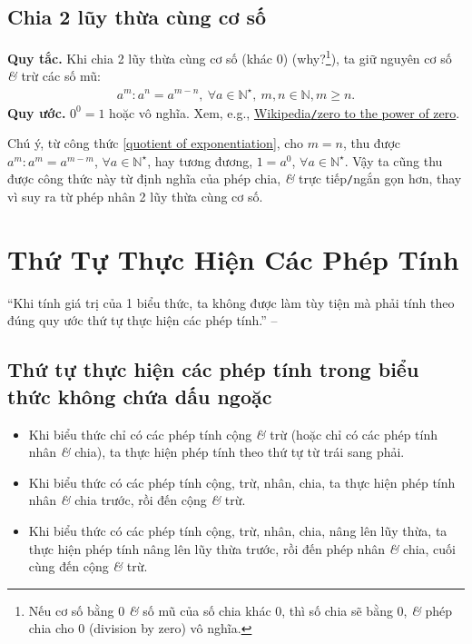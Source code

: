 \documentclass[oneside]{book}
\numberwithin{equation}{section}
\begin{document}
\subsection{Chia 2 lũy thừa cùng cơ số}
\textbf{Quy tắc.} Khi chia 2 lũy thừa cùng cơ số (khác $0$) (why?\footnote{Nếu cơ số bằng 0 \textit{\&} số mũ của số chia khác 0, thì số chia sẽ bằng 0, \textit{\&} phép chia cho 0 (division by zero) vô nghĩa.}), ta giữ nguyên cơ số \textit{\&} trừ các số mũ:
\begin{align}
	\label{quotient of exponentiation}
	\boxed{a^m:a^n = a^{m-n},\ \forall a\in\mathbb{N}^\star,\ m,n\in\mathbb{N},m\ge n.}
\end{align}
\textbf{Quy ước.} $0^0 = 1$ hoặc vô nghĩa. Xem, e.g., \href{https://en.wikipedia.org/wiki/Zero_to_the_power_of_zero}{Wikipedia\texttt{/}zero to the power of zero}.

Chú ý, từ công thức \eqref{quotient of exponentiation}, cho $m = n$, thu được $a^m:a^m = a^{m - m}$, $\forall a\in\mathbb{N}^\star$, hay tương đương, $1 = a^0$, $\forall a\in\mathbb{N}^\star$. Vậy ta cũng thu được công thức này từ định nghĩa của phép chia, \textit{\&} trực tiếp\texttt{/}ngắn gọn hơn, thay vì suy ra từ phép nhân 2 lũy thừa cùng cơ số.


\section{Thứ Tự Thực Hiện Các Phép Tính}
``Khi tính giá trị của 1 biểu thức, ta không được làm tùy tiện mà phải tính theo đúng quy ước thứ tự thực hiện các phép tính.'' -- \cite[p. 26]{Thai_Anh_Dat_Ha_Loan_Nam_Quang_Toan_6_tap_2}

\subsection{Thứ tự thực hiện các phép tính trong biểu thức không chứa dấu ngoặc}
\begin{tcolorbox}
	\begin{itemize}
		\item Khi biểu thức chỉ có các phép tính cộng \textit{\&} trừ (hoặc chỉ có các phép tính nhân \textit{\&} chia), ta thực hiện phép tính theo thứ tự từ trái sang phải.
		\item Khi biểu thức có các phép tính cộng, trừ, nhân, chia, ta thực hiện phép tính nhân \textit{\&} chia trước, rồi đến cộng \textit{\&} trừ.
		\item Khi biểu thức có các phép tính cộng, trừ, nhân, chia, nâng lên lũy thừa, ta thực hiện phép tính nâng lên lũy thừa trước, rồi đến phép nhân \textit{\&} chia, cuối cùng đến cộng \textit{\&} trừ.
	\end{itemize}
\end{tcolorbox}
\end{document}

